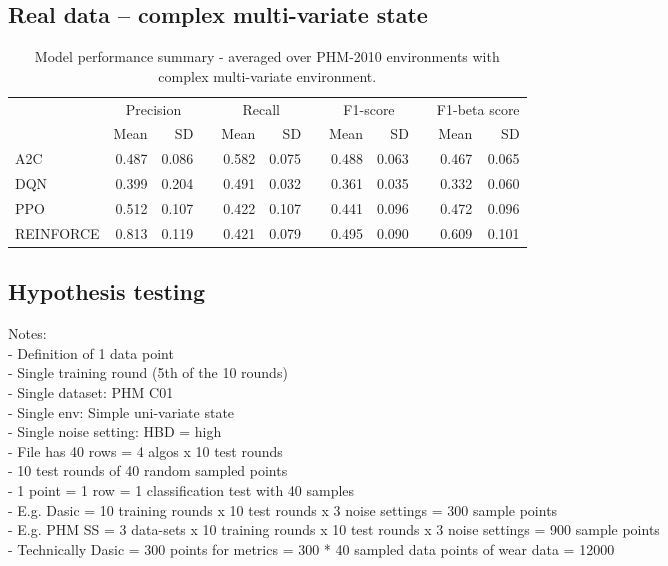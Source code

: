 \documentclass[a4paper, 12pt]{article}
\newcommand{\rowspace}[1]{\renewcommand{\arraystretch}{#1}}
\begin{document}
\subsection{Real data -- complex multi-variate state}
\begin{table}[hbt!]\centering
	\sffamily
	\rowspace{1.3}
	\begin{tabular}{@{}l rr c rr c rr c rr@{}}
		\arrayrulecolor{black!40}\toprule
		& \multicolumn{2}{c}{Precision} & \phantom{i} & \multicolumn{2}{c}{Recall} & \phantom{i} & \multicolumn{2}{c}{F1-score} & \phantom{i} & \multicolumn{2}{c}{F1-beta score} \\
		\cmidrule{2-3} \cmidrule{5-6} \cmidrule{8-9} \cmidrule{11-12} 
		
		&Mean &SD & &Mean &SD & &Mean &SD& &Mean & SD\\ \midrule
		A2C & 0.487 & 0.086 & &0.582 & 0.075 & & 0.488 & 0.063 & &0.467 &0.065 \\
		DQN & 0.399 & 0.204 & &0.491 & 0.032 & & 0.361 & 0.035 & &0.332 &0.060 \\
		PPO & 0.512 & 0.107 & &0.422 & 0.107 & & 0.441 & 0.096 & &0.472 &0.096 \\
		REINFORCE & 0.813 & 0.119 & &0.421 & 0.079 & & 0.495 & 0.090 & &0.609 &0.101 \\
		
		
		\bottomrule
	\end{tabular}
	\caption{Model performance summary - averaged over PHM-2010 environments with complex multi-variate environment.}
	\label{tbl:PHMMS}
\end{table}

\subsection{Hypothesis testing}

Notes: \\
- Definition of 1 data point\\
- Single training round (5th of the 10 rounds)\\
- Single dataset:  PHM C01\\
- Single env:  Simple uni-variate state\\
- Single noise setting:  HBD = high\\
- File has 40 rows = 4 algos x 10 test rounds\\
- 10 test rounds of 40 random sampled points\\
- 1 point = 1 row = 1 classification test with 40 samples\\
- E.g. Dasic = 10 training rounds x 10 test rounds x 3 noise settings = 300 sample points\\
- E.g. PHM SS = 3 data-sets x 10 training rounds x 10 test rounds x 3 noise settings = 900 sample points\\
- Technically Dasic = 300 points for metrics = 300 * 40 sampled data points of wear data = 12000\\
\end{document}
